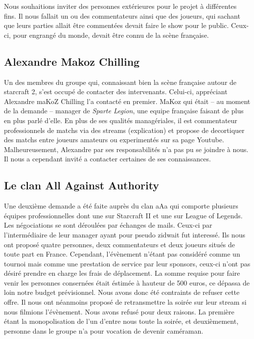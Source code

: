 Nous souhaitions inviter des personnes extérieures pour le projet à
différentes fins. Il nous fallait un ou des commentateurs ainsi que des
joueurs, qui sachant que leurs parties allait être commentées devait faire
le show pour le public. Ceux-ci, pour engrangé du monde, devait être
connu de la scène française.

\subsection{Alexandre \og Makoz \fg{} Chilling}%
\label{sub:alexandre_makoz_chilling}

Un des membres du groupe qui, connaissant bien la scène française autour
de starcraft 2, s'est occupé de contacter des intervenants.  Celui-ci,
appréciant Alexandre \og maKoZ \fg{} Chilling l'a contacté en premier. MaKoz qui
était -- au moment de la demande -- manager de \emph{Sparte Legion}, une equipe
française faisant de plus en plus parlé d'elle. En plus de ses qualités
managériales, il est commentateur professionnels de matchs via des
streams (explication) et propose de decortiquer des matchs entre joueurs
amateurs ou experimentés sur sa page Youtube. Malheureusement, Alexandre
par ses responsabilités n'a pas pu se joindre à nous. Il nous a
cependant invité a contacter certaines de ses connaissances.

\subsection{Le clan \og All Against Authority \fg{}}%
\label{sub:le_clan_all_against_authority}

Une deuxième demande a été faite auprès du clan \og aAa \fg{} qui
comporte plusieurs équipes professionnelles dont une sur Starcraft II et
une sur League of Legends. Les négociations se sont déroulées par
échanges de mails.  Ceux-ci par l'intermédiaire de leur manager ayant
pour pseudo \og zidwait \fg{} fut interessé. Ils nous ont proposé quatre
personnes, deux commentateurs et deux joueurs situés de toute part en
France.  Cependant, l'évènement n'étant pas considéré comme un tournoi
mais comme une prestation de service par leur sponsors, ceux-ci n'ont
pas désiré prendre en charge les frais de déplacement. La somme requise
pour faire venir les personnes consernées était éstimée à hauteur de 500
euros, ce dépassa de loin notre budget prévisionnel. Nous avons donc été
contraints de refuser cette offre. Il nous ont néanmoins proposé de
retransmettre la soirée sur leur stream si nous filmions l'évènement.
Nous avons refusé pour deux raisons. La première étant la monopolisation
de l'un d'entre nous toute la soirée, et deuxièmement, personne dans le
groupe n'a pour vocation de devenir caméraman.

